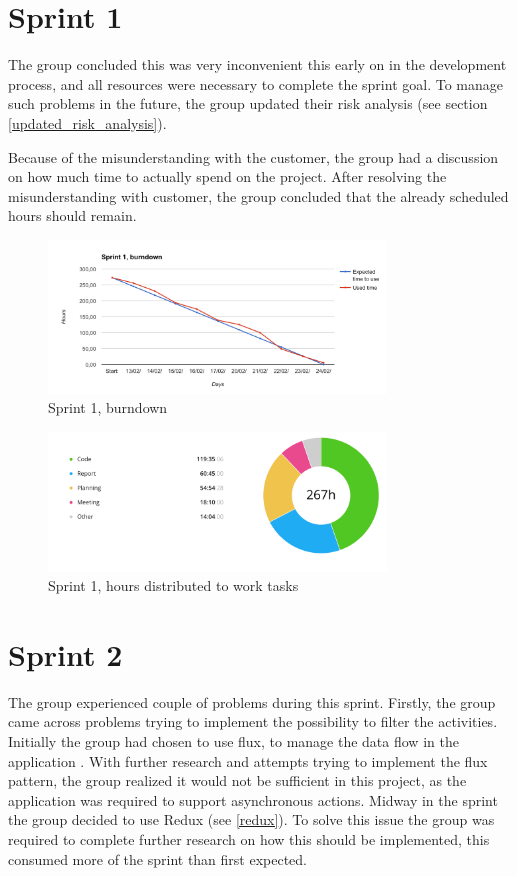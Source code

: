\section{Sprint 1}
\label{Sprints-sprint1}
The group concluded this was very inconvenient this early on in the development process, and all resources were necessary to complete the sprint goal. To manage such problems in the future, the group updated their risk analysis (see section \ref{updated_risk_analysis}). 

Because of the misunderstanding with the customer, the group had a discussion on how much time to actually spend on the project. After resolving the misunderstanding with customer, the group concluded that the already scheduled hours should remain.

\begin{figure}[ht]
\centering
    \includegraphics[width=0.8\textwidth]{fig/sprint1}
\caption{Sprint 1, burndown}
\end{figure}

\begin{figure}[ht]
\centering
    \includegraphics[width=0.8\textwidth]{fig/sprint1-diagram}
\caption{Sprint 1, hours distributed to work tasks}
\end{figure}

\section{Sprint 2}
\label{Sprints-sprint2}
The group experienced couple of problems during this sprint. Firstly, the group came across problems trying to implement the possibility to filter the activities. Initially the group had chosen to use flux, to manage the data flow in the application \cite{flux}. With further research and attempts trying to implement the flux pattern, the group realized it would not be sufficient in this project, as the application was required to support asynchronous actions. Midway in the sprint the group decided to use Redux (see \ref{redux}). To solve this issue the group was required to complete further research on how this should be implemented, this consumed more of the sprint than first expected.

